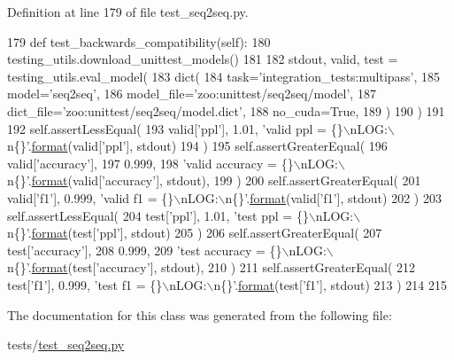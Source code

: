 Definition at line 179 of file test\+\_\+seq2seq.\+py.


\begin{DoxyCode}
179     \textcolor{keyword}{def }test\_backwards\_compatibility(self):
180         testing\_utils.download\_unittest\_models()
181 
182         stdout, valid, test = testing\_utils.eval\_model(
183             dict(
184                 task=\textcolor{stringliteral}{'integration\_tests:multipass'},
185                 model=\textcolor{stringliteral}{'seq2seq'},
186                 model\_file=\textcolor{stringliteral}{'zoo:unittest/seq2seq/model'},
187                 dict\_file=\textcolor{stringliteral}{'zoo:unittest/seq2seq/model.dict'},
188                 no\_cuda=\textcolor{keyword}{True},
189             )
190         )
191 
192         self.assertLessEqual(
193             valid[\textcolor{stringliteral}{'ppl'}], 1.01, \textcolor{stringliteral}{'valid ppl = \{\}\(\backslash\)nLOG:\(\backslash\)n\{\}'}.\hyperlink{namespaceparlai_1_1chat__service_1_1services_1_1messenger_1_1shared__utils_a32e2e2022b824fbaf80c747160b52a76}{format}(valid[\textcolor{stringliteral}{'ppl'}], stdout)
194         )
195         self.assertGreaterEqual(
196             valid[\textcolor{stringliteral}{'accuracy'}],
197             0.999,
198             \textcolor{stringliteral}{'valid accuracy = \{\}\(\backslash\)nLOG:\(\backslash\)n\{\}'}.\hyperlink{namespaceparlai_1_1chat__service_1_1services_1_1messenger_1_1shared__utils_a32e2e2022b824fbaf80c747160b52a76}{format}(valid[\textcolor{stringliteral}{'accuracy'}], stdout),
199         )
200         self.assertGreaterEqual(
201             valid[\textcolor{stringliteral}{'f1'}], 0.999, \textcolor{stringliteral}{'valid f1 = \{\}\(\backslash\)nLOG:\(\backslash\)n\{\}'}.\hyperlink{namespaceparlai_1_1chat__service_1_1services_1_1messenger_1_1shared__utils_a32e2e2022b824fbaf80c747160b52a76}{format}(valid[\textcolor{stringliteral}{'f1'}], stdout)
202         )
203         self.assertLessEqual(
204             test[\textcolor{stringliteral}{'ppl'}], 1.01, \textcolor{stringliteral}{'test ppl = \{\}\(\backslash\)nLOG:\(\backslash\)n\{\}'}.\hyperlink{namespaceparlai_1_1chat__service_1_1services_1_1messenger_1_1shared__utils_a32e2e2022b824fbaf80c747160b52a76}{format}(test[\textcolor{stringliteral}{'ppl'}], stdout)
205         )
206         self.assertGreaterEqual(
207             test[\textcolor{stringliteral}{'accuracy'}],
208             0.999,
209             \textcolor{stringliteral}{'test accuracy = \{\}\(\backslash\)nLOG:\(\backslash\)n\{\}'}.\hyperlink{namespaceparlai_1_1chat__service_1_1services_1_1messenger_1_1shared__utils_a32e2e2022b824fbaf80c747160b52a76}{format}(test[\textcolor{stringliteral}{'accuracy'}], stdout),
210         )
211         self.assertGreaterEqual(
212             test[\textcolor{stringliteral}{'f1'}], 0.999, \textcolor{stringliteral}{'test f1 = \{\}\(\backslash\)nLOG:\(\backslash\)n\{\}'}.\hyperlink{namespaceparlai_1_1chat__service_1_1services_1_1messenger_1_1shared__utils_a32e2e2022b824fbaf80c747160b52a76}{format}(test[\textcolor{stringliteral}{'f1'}], stdout)
213         )
214 
215 
\end{DoxyCode}


The documentation for this class was generated from the following file\+:\begin{DoxyCompactItemize}
\item 
tests/\hyperlink{test__seq2seq_8py}{test\+\_\+seq2seq.\+py}\end{DoxyCompactItemize}

